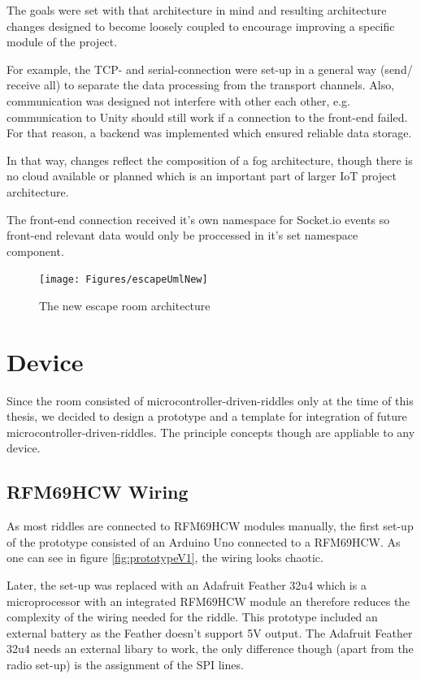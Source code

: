 The goals were set with that architecture in mind and resulting architecture changes
designed to become loosely coupled to encourage improving a specific module of the project.

For example, the TCP- and serial-connection were set-up in a general way (send/ receive all) 
to separate the data processing from the transport channels. 
Also, communication was designed not interfere with other each other, e.g. 
communication to Unity should still work if a connection to the front-end failed.
For that reason, a backend was implemented which ensured reliable data storage.

In that way, changes reflect the composition of a fog architecture, 
though there is no cloud available or planned which is an important part 
of larger IoT project architecture.

The front-end connection received it's own namespace for Socket.io events so front-end relevant data
would only be proccessed in it's set namespace component.

\begin{figure}
	\centering
	\texttt{[image: Figures/escapeUmlNew]}
	\caption[New Escape Room Architecture]{The new escape room architecture}
	\label{fig:newEscapeUml}
\end{figure}

\section{Device}
Since the room consisted of microcontroller-driven-riddles only at the time of this thesis, 
we decided to design a prototype and a template for integration of future microcontroller-driven-riddles.
The principle concepts though are appliable to any device.

\subsection{RFM69HCW Wiring}
As most riddles are connected to RFM69HCW modules manually, the first set-up of the prototype 
consisted of an Arduino Uno connected to a RFM69HCW. As one can see in figure \ref{fig:prototypeV1},
the wiring looks chaotic.

Later, the set-up was replaced with an Adafruit Feather 32u4 which is a microprocessor with an integrated 
RFM69HCW module an therefore reduces the complexity of the wiring needed for the riddle.
This prototype included an external battery as the Feather doesn't support 5V output.
The Adafruit Feather 32u4 needs an external libary to work, the only difference though (apart from the radio set-up)
is the assignment of the SPI lines.


